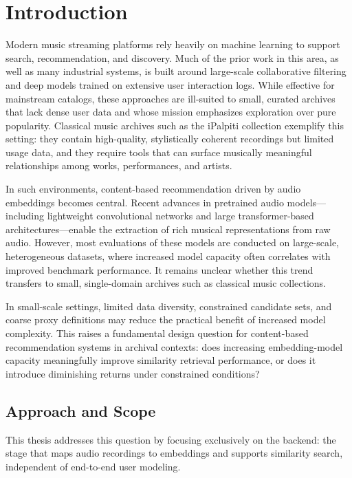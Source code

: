 \chapter{Introduction}\label{ch:introduction}

Modern music streaming platforms rely heavily on machine learning to support search, recommendation, and discovery.
Much of the prior work in this area, as well as many industrial systems, is built around large-scale collaborative filtering and deep models trained on extensive user interaction logs.
While effective for mainstream catalogs, these approaches are ill-suited to small, curated archives that lack dense user data and whose mission emphasizes exploration over pure popularity.
Classical music archives such as the iPalpiti collection exemplify this setting: they contain high-quality, stylistically coherent recordings but limited usage data, and they require tools that can surface musically meaningful relationships among works, performances, and artists.

In such environments, content-based recommendation driven by audio embeddings becomes central.
Recent advances in pretrained audio models---including lightweight convolutional networks and large transformer-based architectures---enable the extraction of rich musical representations from raw audio.
However, most evaluations of these models are conducted on large-scale, heterogeneous datasets, where increased model capacity often correlates with improved benchmark performance.
It remains unclear whether this trend transfers to small, single-domain archives such as classical music collections.

In small-scale settings, limited data diversity, constrained candidate sets, and coarse proxy definitions may reduce the practical benefit of increased model complexity.
This raises a fundamental design question for content-based recommendation systems in archival contexts: does increasing embedding-model capacity meaningfully improve similarity retrieval performance, or does it introduce diminishing returns under constrained conditions?


\section{Approach and Scope}

This thesis addresses this question by focusing exclusively on the backend: 
the stage that maps audio recordings to embeddings and supports similarity search, independent of end-to-end user modeling.

